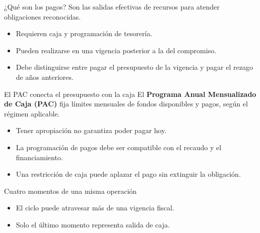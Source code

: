 \begin{frame}{¿Qué son los pagos?}
Son las salidas efectivas de recursos para atender obligaciones reconocidas.
\begin{itemize}
  \item Requieren caja y programación de tesorería.
  \item Pueden realizarse en una vigencia posterior a la del compromiso.
  \item Debe distinguirse entre pagar el presupuesto de la vigencia y pagar el rezago de años anteriores.
\end{itemize}
\end{frame}

\begin{frame}{El PAC conecta el presupuesto con la caja}
El \textbf{Programa Anual Mensualizado de Caja (PAC)} fija límites mensuales de fondos disponibles y pagos, según el régimen aplicable.
\begin{itemize}
  \item Tener apropiación no garantiza poder pagar hoy.
  \item La programación de pagos debe ser compatible con el recaudo y el financiamiento.
  \item Una restricción de caja puede aplazar el pago sin extinguir la obligación.
\end{itemize}
\end{frame}

\begin{frame}{Cuatro momentos de una misma operación}
\centering
{}
\vspace{1.3em}
\begin{itemize}
  \item El ciclo puede atravesar más de una vigencia fiscal.
  \item Solo el último momento representa salida de caja.
\end{itemize}
\end{frame}

